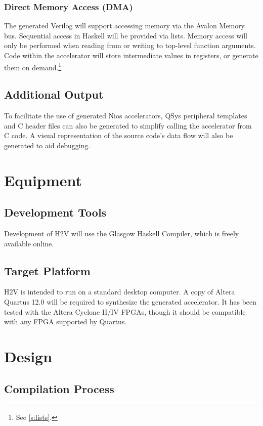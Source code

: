 \documentclass[english,onecolumn]{article}
\begin{document}
\subsubsection{Direct Memory Access (DMA)}
\label{s:DMA}
The generated Verilog will support accessing memory via the Avalon Memory bus. Sequential access in Haskell will be provided via lists.
Memory access will only be performed when reading from or writing to top-level function arguments. Code within the accelerator will store intermediate values in registers, or generate them on demand.\footnote{See \ref{s:lists}.}

\subsection{Additional Output}
To facilitate the use of generated Nios accelerators, QSys peripheral templates and C header files can also be generated to simplify calling the accelerator from C code.
A visual representation of the source code's data flow will also be generated to aid debugging.

\section{Equipment}
\subsection{Development Tools}
Development of H2V will use the Glasgow Haskell Compiler, which is freely available online.

\subsection{Target Platform}
H2V is intended to run on a standard desktop computer. A copy of Altera Quartus 12.0 will be required to synthesize the generated accelerator. It has been tested with the Altera Cyclone II/IV FPGAs, though it should be compatible with any FPGA supported by Quartus.

\section{Design}
\subsection{Compilation Process}

\end{document}
